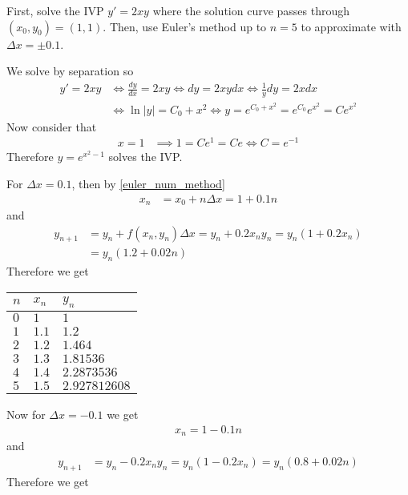 \documentclass[notes]{subfiles}
\begin{document}
\begin{exercise} \label{euler_method_exercise}
    First, solve the IVP $y' = 2xy$ where the solution curve passes through $(x_0, y_0) = (1, 1)$. Then, use Euler's method up to $n = 5$ to approximate with $\Delta x = \pm 0.1$.
\end{exercise}
\begin{solution}
    We solve by separation so
    \begin{align*}
        y' = 2xy
        &\iff \frac{dy}{dx} = 2xy
        \iff dy = 2xydx
        \iff \frac{1}{y}dy = 2xdx \\
        &\iff \ln|y| = C_0 + x^2
        \iff y = e^{C_0 + x^2} = e^{C_0} e^{x^2} = Ce^{x^2}
    \end{align*}
    Now consider that
    \begin{align*}
        x = 1
        &\implies 1 = Ce^1 = Ce
        \iff C = e^{-1}
    \end{align*}
    Therefore $y = e^{x^2 - 1}$ solves the IVP.

    For $\Delta x = 0.1$, then by \cref{euler_num_method}
    \begin{align*}
        x_n
        &= x_0 + n\Delta x
        = 1 + 0.1n
    \end{align*}
    and
    \begin{align*}
        y_{n + 1}
        &= y_n + f(x_n, y_n)\Delta x
        = y_n + 0.2x_n y_n
        = y_n(1 + 0.2x_n) \\
        &= y_n(1.2 + 0.02n)
    \end{align*}
    Therefore we get

    \begin{tabularx}{0.5\textwidth}{X | X | X}
        $n$ & $x_n$ & $y_n$ \\ \hline
        $0$ & $1$ & $1$ \\
        $1$ & $1.1$ & $1.2$ \\
        $2$ & $1.2$ & $1.464$ \\
        $3$ & $1.3$ & $1.81536$ \\
        $4$ & $1.4$ & $2.2873536$ \\
        $5$ & $1.5$ & $2.927812608$
    \end{tabularx}

    Now for $\Delta x = -0.1$ we get
    \begin{align*}
        x_n = 1 - 0.1n
    \end{align*}
    and
    \begin{align*}
        y_{n + 1}
        &= y_n - 0.2x_n y_n
        = y_n(1 - 0.2x_n)
        = y_n(0.8 + 0.02n)
    \end{align*}
    Therefore we get 


\end{solution}
\end{document}
